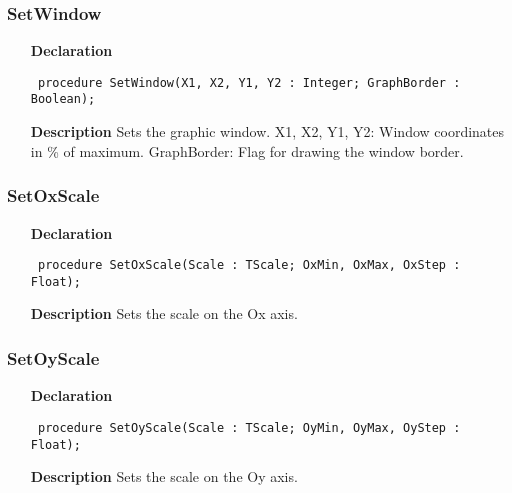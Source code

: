 \documentclass[12pt,a4paper,oneside]{report}
\newcommand{\declarationitem}[1]{\textbf{#1}}
\newcommand{\descriptiontitle}[1]{\textbf{#1}}
\newcommand{\code}[1]{\texttt{#1}}
\begin{document}
\subsubsection{SetWindow}
\label{uplot-SetWindow}
\begin{itemize}\item[\declarationitem{Declaration}\hfill]
	\begin{flushleft}
		\code{
			procedure SetWindow(X1, X2, Y1, Y2 : Integer; GraphBorder : Boolean);}
		
	\end{flushleft}
	
	\par
	\item[\descriptiontitle{Description}]
	Sets the graphic window. X1, X2, Y1, Y2: Window coordinates in {\%} of maximum. GraphBorder: Flag for drawing the window border.
	
\end{itemize}
\subsubsection{SetOxScale}
\label{uplot-SetOxScale}
\begin{itemize}\item[\declarationitem{Declaration}\hfill]
	\begin{flushleft}
		\code{
			procedure SetOxScale(Scale : TScale; OxMin, OxMax, OxStep : Float);}
		
	\end{flushleft}
	
	\par
	\item[\descriptiontitle{Description}]
	Sets the scale on the Ox axis.
\end{itemize}
\subsubsection{SetOyScale}
\label{uplot-SetOyScale}
\begin{itemize}\item[\declarationitem{Declaration}\hfill]
	\begin{flushleft}
		\code{
			procedure SetOyScale(Scale : TScale; OyMin, OyMax, OyStep : Float);}
		
	\end{flushleft}
	
	\par
	\item[\descriptiontitle{Description}]
	Sets the scale on the Oy axis.
	
\end{itemize}
\end{document}
